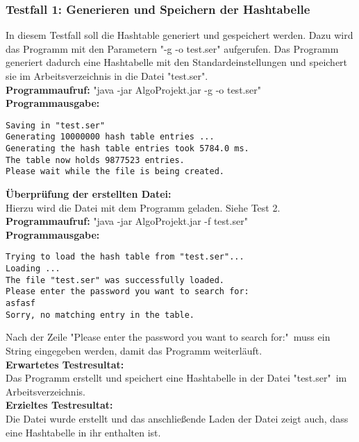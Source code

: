 \documentclass[11pt]{article}
\begin{document}
  \subsubsection{Testfall 1: Generieren und Speichern der Hashtabelle}
    In diesem Testfall soll die Hashtable generiert und gespeichert werden. Dazu wird das Programm mit den Parametern "-g -o test.ser" aufgerufen. Das Programm generiert dadurch eine Hashtabelle mit den Standardeinstellungen und speichert sie im Arbeitsverzeichnis in die Datei "test.ser".\\
    \textbf{Programmaufruf:} "java -jar AlgoProjekt.jar -g -o test.ser"\\
    \textbf{Programmausgabe:}
    \begin{verbatim}
Saving in "test.ser"
Generating 10000000 hash table entries ...
Generating the hash table entries took 5784.0 ms.
The table now holds 9877523 entries.
Please wait while the file is being created.
    \end{verbatim}
    \textbf{Überprüfung der erstellten Datei:}\\
    Hierzu wird die Datei mit dem Programm geladen. Siehe Test 2.\\
    \textbf{Programmaufruf:}
    "java -jar AlgoProjekt.jar -f test.ser"\\
 	\textbf{Programmausgabe:}
 	\begin{verbatim}
Trying to load the hash table from "test.ser"...
Loading ...
The file "test.ser" was successfully loaded.
Please enter the password you want to search for: 
asfasf
Sorry, no matching entry in the table.
 	\end{verbatim}
 	Nach der Zeile "Please enter the password you want to search for:"\
 	muss ein String eingegeben werden, damit das Programm weiterläuft.\\
 	\textbf{Erwartetes Testresultat:}\\
Das Programm erstellt und speichert eine Hashtabelle in der Datei "test.ser"\ im Arbeitsverzeichnis.\\
\textbf{Erzieltes Testresultat:}\\
Die Datei wurde erstellt und das anschließende Laden der Datei zeigt auch, dass eine Hashtabelle in ihr enthalten ist.
\end{document}
